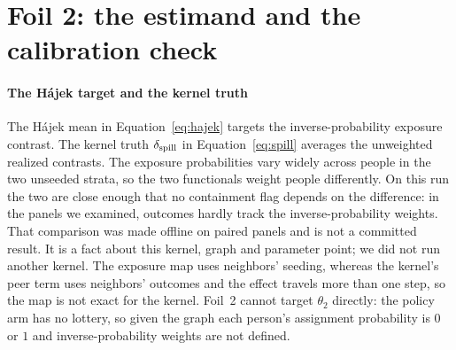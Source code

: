 \section{Foil 2: the estimand and the calibration check}\label{app:foil2}

\paragraph{The H\'ajek target and the kernel truth} The H\'ajek mean in
Equation~\eqref{eq:hajek} targets the inverse-probability exposure contrast. The
kernel truth $\delta_{\mathrm{spill}}$ in Equation~\eqref{eq:spill} averages the unweighted
realized contrasts. The exposure probabilities vary widely across people in the
two unseeded strata, so the two functionals weight people differently. On this run
the two are close enough that no containment flag depends on the difference: in the
panels we examined, outcomes hardly track the inverse-probability weights. That
comparison was made offline on paired panels and is not a committed result. It is
a fact about this kernel, graph and parameter point; we did not run another kernel.
The exposure map uses neighbors' seeding, whereas the kernel's peer term uses
neighbors' outcomes and the effect travels more than one step, so the map is not
exact for the kernel. Foil~2 cannot target $\theta_2$ directly: the policy arm has
no lottery, so given the graph each person's assignment probability is $0$ or $1$
and inverse-probability weights are not defined.

